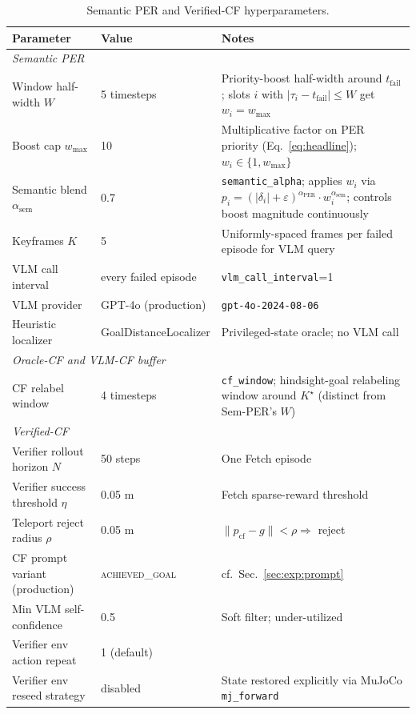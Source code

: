\begin{table}[t]
\centering
\footnotesize
\caption{Semantic PER and Verified-CF hyperparameters.}
\label{tab:hparams-semper}
\begin{tabular}{l l l}
\toprule
Parameter & Value & Notes \\
\midrule
\multicolumn{3}{l}{\textit{Semantic PER}} \\
Window half-width $W$ & 5 timesteps & Priority-boost half-width around $t_{\text{fail}}$; slots $i$ with $|\tau_i - t_{\text{fail}}| \le W$ get $w_i = w_{\max}$ \\
Boost cap $w_{\max}$ & 10 & Multiplicative factor on PER priority (Eq.~\ref{eq:headline}); $w_i \in \{1, w_{\max}\}$ \\
Semantic blend $\alpha_{\text{sem}}$ & 0.7 & \texttt{semantic\_alpha}; applies $w_i$ via $p_i = (|\delta_i|+\varepsilon)^{\alpha_{\text{PER}}} \cdot w_i^{\alpha_{\text{sem}}}$; controls boost magnitude continuously \\
Keyframes $K$ & 5 & Uniformly-spaced frames per failed episode for VLM query \\
VLM call interval & every failed episode & \texttt{vlm\_call\_interval}=1 \\
VLM provider & GPT-4o (production) & \texttt{gpt-4o-2024-08-06} \\
Heuristic localizer & GoalDistanceLocalizer & Privileged-state oracle; no VLM call \\
\midrule
\multicolumn{3}{l}{\textit{Oracle-CF and VLM-CF buffer}} \\
CF relabel window & 4 timesteps & \texttt{cf\_window}; hindsight-goal relabeling window around $K^\star$ (distinct from Sem-PER's $W$) \\
\midrule
\multicolumn{3}{l}{\textit{Verified-CF}} \\
Verifier rollout horizon $N$ & 50 steps & One Fetch episode \\
Verifier success threshold $\eta$ & 0.05 m & Fetch sparse-reward threshold \\
Teleport reject radius $\rho$ & 0.05 m & $\|p_{\text{cf}}-g\| < \rho \Rightarrow$ reject \\
CF prompt variant (production) & \textsc{achieved\_goal} & cf.\ Sec.~\ref{sec:exp:prompt} \\
Min VLM self-confidence & 0.5 & Soft filter; under-utilized \\
Verifier env action repeat & 1 (default) & \\
Verifier env reseed strategy & disabled & State restored explicitly via MuJoCo \texttt{mj\_forward} \\
\bottomrule
\end{tabular}
\end{table}


